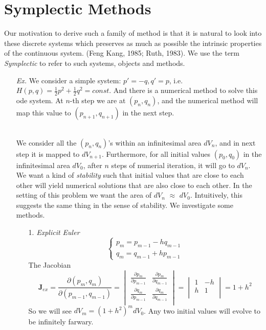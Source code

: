 \documentclass[a4paper, 11pt]{article}
\begin{document}
\section{Symplectic Methods}
Our motivation to derive such a family of method is that it is natural to look into these discrete systems which preserves as much as possible the intrinsic properties of the continuous system. (Feng Kang, 1985; Ruth, 1983). We use the term \emph{Symplectic} to refer to such systems, objects and methods.

\begin{itemize}
	\item[\textit{Ex.}] We consider a simple system: $p'=-q, q'=p$, i.e. $H(p,q)=\frac{1}{2}p^2+\frac{1}{2}q^2 = const$. And there is a numerical method to solve this ode system. At $n$-th step we are at $(p_n, q_n)$, and the numerical method will map this value to $(p_{n+1}, q_{n+1})$ in the next step. 

	~\\
	We consider all the $(p_n, q_n)$'s within an infinitesimal area $dV_n$, and in next step it is mapped to $dV_{n+1}$. Furthermore, for all initial values $(p_0, q_0)$ in the infinitesimal area $dV_0$, after $n$ steps of numerial iteration, it will go to $dV_n$. We want a kind of \emph{stability} such that initial values that are close to each other will yield numerical solutions that are also close to each other. In the setting of this problem we want the area of $dV_n$ $\approx$ $dV_0$. Intuitively, this suggests the same thing in the sense of stability. We investigate some methods.
	\begin{itemize}
		\item[1.] \emph{Explicit Euler}
		\begin{equation}
			\begin{cases}
			p_m = p_{m-1} - hq_{m-1} \\
			q_m = q_{m-1} + hp_{m-1}
			\end{cases}
		\end{equation}
		The Jacobian 
		$$
		\bm{J}_{ex} = \frac{\partial (p_m, q_m)}{\partial (p_{m-1}, q_{m-1})} = \begin{vmatrix}
			\frac{\partial p_m}{\partial p_{m-1}} & \frac{\partial p_m}{\partial q_{m-1}} \\
			\frac{\partial q_m}{\partial p_{m-1}} & \frac{\partial q_m}{\partial q_{m-1}}\\
		\end{vmatrix} = 
		\begin{vmatrix}
			1 & -h \\
			h & 1\\
		\end{vmatrix} = 1+h^2
		$$
		So we will see $dV_m = (1+h^2)^{m} dV_0$. Any two initial values will evolve to be infinitely farwary.


\end{itemize}
\end{itemize}
\end{document}
